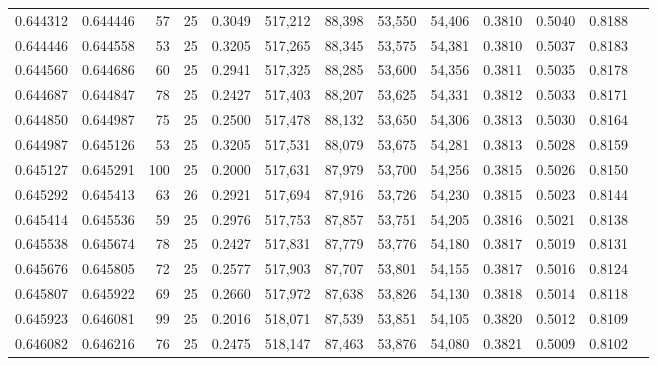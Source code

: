 \begin{tabular}{rrrrrrrrrrrrr}
0.644312 & 0.644446 &    57 &  25 &                                     0.3049 & 517,212 &  88,398 &  53,550 &  54,406 & 0.3810 & 0.5040 & 0.8188 \\
0.644446 & 0.644558 &    53 &  25 &                                     0.3205 & 517,265 &  88,345 &  53,575 &  54,381 & 0.3810 & 0.5037 & 0.8183 \\
0.644560 & 0.644686 &    60 &  25 &                                     0.2941 & 517,325 &  88,285 &  53,600 &  54,356 & 0.3811 & 0.5035 & 0.8178 \\
0.644687 & 0.644847 &    78 &  25 &                                     0.2427 & 517,403 &  88,207 &  53,625 &  54,331 & 0.3812 & 0.5033 & 0.8171 \\
0.644850 & 0.644987 &    75 &  25 &                                     0.2500 & 517,478 &  88,132 &  53,650 &  54,306 & 0.3813 & 0.5030 & 0.8164 \\
0.644987 & 0.645126 &    53 &  25 &                                     0.3205 & 517,531 &  88,079 &  53,675 &  54,281 & 0.3813 & 0.5028 & 0.8159 \\
0.645127 & 0.645291 &   100 &  25 &                                     0.2000 & 517,631 &  87,979 &  53,700 &  54,256 & 0.3815 & 0.5026 & 0.8150 \\
0.645292 & 0.645413 &    63 &  26 &                                     0.2921 & 517,694 &  87,916 &  53,726 &  54,230 & 0.3815 & 0.5023 & 0.8144 \\
0.645414 & 0.645536 &    59 &  25 &                                     0.2976 & 517,753 &  87,857 &  53,751 &  54,205 & 0.3816 & 0.5021 & 0.8138 \\
0.645538 & 0.645674 &    78 &  25 &                                     0.2427 & 517,831 &  87,779 &  53,776 &  54,180 & 0.3817 & 0.5019 & 0.8131 \\
0.645676 & 0.645805 &    72 &  25 &                                     0.2577 & 517,903 &  87,707 &  53,801 &  54,155 & 0.3817 & 0.5016 & 0.8124 \\
0.645807 & 0.645922 &    69 &  25 &                                     0.2660 & 517,972 &  87,638 &  53,826 &  54,130 & 0.3818 & 0.5014 & 0.8118 \\
0.645923 & 0.646081 &    99 &  25 &                                     0.2016 & 518,071 &  87,539 &  53,851 &  54,105 & 0.3820 & 0.5012 & 0.8109 \\
0.646082 & 0.646216 &    76 &  25 &                                     0.2475 & 518,147 &  87,463 &  53,876 &  54,080 & 0.3821 & 0.5009 & 0.8102 \\

\end{tabular}
